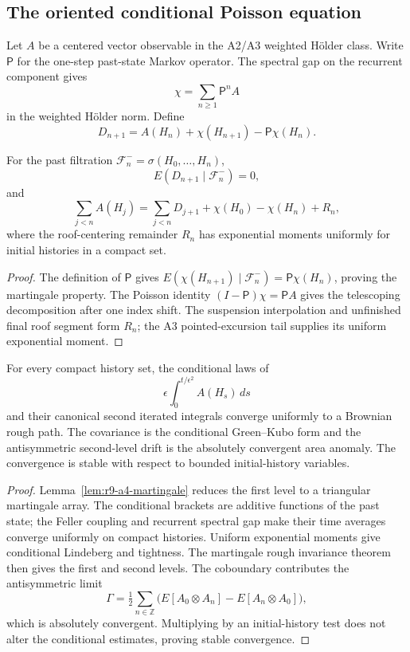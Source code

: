 \subsection{The oriented conditional Poisson equation}

Let $A$ be a centered vector observable in the A2/A3 weighted H\"older class.
Write $\mathsf P$ for the one-step past-state Markov operator.  The spectral
gap on the recurrent component gives
\[
 \chi=\sum_{n\ge1}\mathsf P^nA
\]
in the weighted H\"older norm.  Define
\[
 D_{n+1}=A(H_n)+\chi(H_{n+1})-\mathsf P\chi(H_n).
\]

\begin{lemma}
\label{lem:r9-a4-martingale}
For the past filtration $\mathcal F_n^-=\sigma(H_0,\ldots,H_n)$,
\[
 E(D_{n+1}\mid\mathcal F_n^-)=0,
\]
and
\[
 \sum_{j<n}A(H_j)=\sum_{j<n}D_{j+1}
 +\chi(H_0)-\chi(H_n)+R_n,
\]
where the roof-centering remainder $R_n$ has exponential moments uniformly for
initial histories in a compact set.
\end{lemma}

\begin{proof}
The definition of $\mathsf P$ gives
$E(\chi(H_{n+1})\mid\mathcal F_n^-)=\mathsf P\chi(H_n)$, proving the martingale
property.  The Poisson identity
$(I-\mathsf P)\chi=\mathsf PA$ gives the telescoping decomposition after one
index shift.  The suspension interpolation and unfinished final roof segment
form $R_n$; the A3 pointed-excursion tail supplies its uniform exponential
moment.
\end{proof}

\begin{theorem}
\label{thm:r9-a4-quenched}
For every compact history set, the conditional laws of
\[
 \epsilon\int_0^{t/\epsilon^2}A(H_s)\,ds
\]
and their canonical second iterated integrals converge uniformly to a Brownian
rough path.  The covariance is the conditional Green--Kubo form and the
antisymmetric second-level drift is the absolutely convergent area anomaly.
The convergence is stable with respect to bounded initial-history variables.
\end{theorem}

\begin{proof}
Lemma~\ref{lem:r9-a4-martingale} reduces the first level to a triangular
martingale array.  The conditional brackets are additive functions of the past
state; the Feller coupling and recurrent spectral gap make their time averages
converge uniformly on compact histories.  Uniform exponential moments give
conditional Lindeberg and tightness.  The martingale rough invariance theorem
then gives the first and second levels.  The coboundary contributes the
antisymmetric limit
\[
 \Gamma=\tfrac12\sum_{n\in\mathbb Z}
 \bigl(E[A_0\otimes A_n]-E[A_n\otimes A_0]\bigr),
\]
which is absolutely convergent.  Multiplying by an initial-history test does
not alter the conditional estimates, proving stable convergence.
\end{proof}

